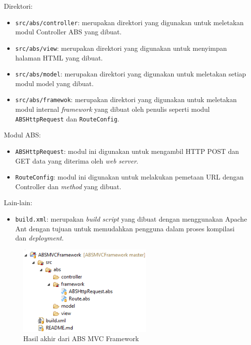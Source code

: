 Direktori:
\begin{itemize}
    \item \texttt{src/abs/controller}: merupakan direktori yang digunakan untuk meletakan modul Controller ABS yang dibuat.
    \item \texttt{src/abs/view}: merupakan direktori yang digunakan untuk menyimpan halaman HTML yang dibuat.
    \item \texttt{src/abs/model}: merupakan direktori yang digunakan untuk meletakan setiap modul model yang dibuat.
    \item \texttt{src/abs/framewok}: merupakan direktori yang digunakan untuk meletakan modul internal \textit{framework} yang dibuat oleh penulis seperti modul \texttt{ABSHttpRequest} dan \texttt{RouteConfig}.
\end{itemize}

Modul ABS:
\begin{itemize}
    \item \texttt{ABSHttpRequest}: modul ini digunakan untuk mengambil HTTP POST dan GET data yang diterima oleh \textit{web server}.
    \item \texttt{RouteConfig}: modul ini digunakan untuk melakukan pemetaan URL dengan Controller dan \textit{method} yang dibuat.
\end{itemize}

Lain-lain:
\begin{itemize}
    \item \texttt{build.xml}: merupakan \textit{build script} yang dibuat dengan menggunakan Apache Ant dengan tujuan untuk memudahkan pengguna dalam proses kompilasi dan \textit{deployment}.
\end{itemize}

\begin{figure}
    \centering
    \includegraphics[width=0.6\textwidth]{img/abs-mvc-framework.png}
    \caption{Hasil akhir dari ABS MVC Framework}
    \label{fig:absMVCFramework}
\end{figure}

